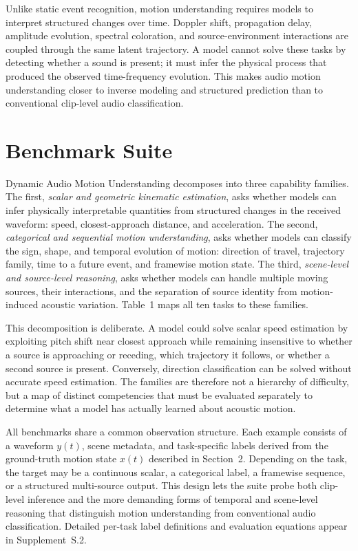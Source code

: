 \documentclass{article}
\begin{document}
Unlike static event recognition, motion understanding requires models to interpret structured changes over time. Doppler shift, propagation delay, amplitude evolution, spectral coloration, and source-environment interactions are coupled through the same latent trajectory. A model cannot solve these tasks by detecting whether a sound is present; it must infer the physical process that produced the observed time-frequency evolution. This makes audio motion understanding closer to inverse modeling and structured prediction than to conventional clip-level audio classification.

\section{Benchmark Suite}

Dynamic Audio Motion Understanding decomposes into three capability families. 
The first, \emph{scalar and geometric kinematic estimation}, asks whether models can infer physically interpretable quantities from structured changes in the received waveform: speed, closest-approach distance, and acceleration. 
The second, \emph{categorical and sequential motion understanding}, asks whether models can classify the sign, shape, and temporal evolution of motion: direction of travel, trajectory family, time to a future event, and framewise motion state. 
The third, \emph{scene-level and source-level reasoning}, asks whether models can handle multiple moving sources, their interactions, and the separation of source identity from motion-induced acoustic variation. 
Table~1 maps all ten tasks to these families.

This decomposition is deliberate. 
A model could solve scalar speed estimation by exploiting pitch shift near closest approach while remaining insensitive to whether a source is approaching or receding, which trajectory it follows, or whether a second source is present. 
Conversely, direction classification can be solved without accurate speed estimation. 
The families are therefore not a hierarchy of difficulty, but a map of distinct competencies that must be evaluated separately to determine what a model has actually learned about acoustic motion.

All benchmarks share a common observation structure. 
Each example consists of a waveform $y(t)$, scene metadata, and task-specific labels derived from the ground-truth motion state $x(t)$ described in Section~2. 
Depending on the task, the target may be a continuous scalar, a categorical label, a framewise sequence, or a structured multi-source output. 
This design lets the suite probe both clip-level inference and the more demanding forms of temporal and scene-level reasoning that distinguish motion understanding from conventional audio classification. 
Detailed per-task label definitions and evaluation equations appear in Supplement~S.2.
\end{document}

